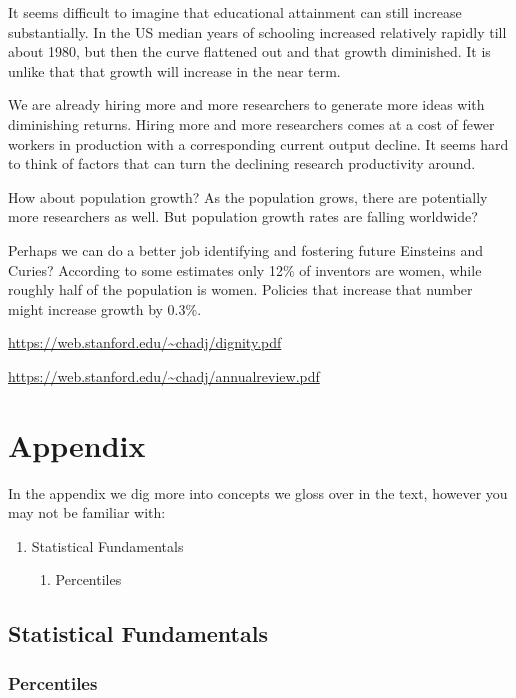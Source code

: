 \documentclass[
]{book}
\providecommand{\tightlist}{%
  \setlength{\itemsep}{0pt}\setlength{\parskip}{0pt}}
\begin{document}
It seems difficult to imagine that educational attainment can still increase substantially. In the US median years of schooling increased relatively rapidly till about 1980, but then the curve flattened out and that growth diminished. It is unlike that that growth will increase in the near term.

We are already hiring more and more researchers to generate more ideas with diminishing returns. Hiring more and more researchers comes at a cost of fewer workers in production with a corresponding current output decline. It seems hard to think of factors that can turn the declining research productivity around.

How about population growth? As the population grows, there are potentially more researchers as well. But population growth rates are falling worldwide?

Perhaps we can do a better job identifying and fostering future Einsteins and Curies? According to some estimates only 12\% of inventors are women, while roughly half of the population is women. Policies that increase that number might increase growth by 0.3\%.

\url{https://web.stanford.edu/~chadj/dignity.pdf}

\url{https://web.stanford.edu/~chadj/annualreview.pdf}

\hypertarget{appendix}{%
\chapter{Appendix}\label{appendix}}

In the appendix we dig more into concepts we gloss over in the text, however you may not be familiar with:

\begin{enumerate}
\def\labelenumi{\arabic{enumi}.}
\tightlist
\item
  Statistical Fundamentals

  \begin{enumerate}
  \def\labelenumii{\alph{enumii}.}
  \tightlist
  \item
    Percentiles
  \end{enumerate}
\end{enumerate}

\hypertarget{statistical-fundamentals}{%
\section{Statistical Fundamentals}\label{statistical-fundamentals}}

\hypertarget{percentiles}{%
\subsection{Percentiles}\label{percentiles}}

  
\end{document}
